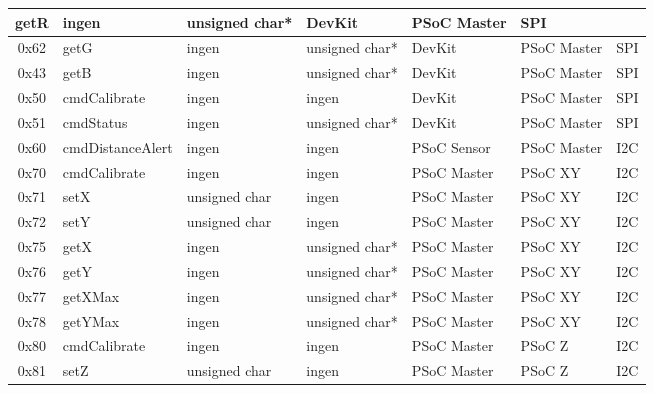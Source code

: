 \begin{table}[H]
\begin{tabular}{|c|l|l|l|l|l|l|}
        getR &
        ingen &
        unsigned char* &
        DevKit &
        PSoC Master &
        SPI \\
    \hline
        0x62 &
        getG &
        ingen &
        unsigned char* &
        DevKit &
        PSoC Master &
        SPI \\
    \hline
        0x43 &
        getB &
        ingen &
        unsigned char* &
        DevKit &
        PSoC Master &
        SPI \\
    \hline
        0x50 &
        cmdCalibrate &
        ingen &
        ingen &
        DevKit &
        PSoC Master &
        SPI \\
    \hline
        0x51 &
        cmdStatus &
        ingen &
        unsigned char* &
        DevKit &
        PSoC Master &
        SPI \\
    \hline
        0x60 &
        cmdDistanceAlert &
        ingen &
        ingen &
        PSoC Sensor &
        PSoC Master &
        I2C \\
    \hline
        0x70 &
        cmdCalibrate &
        ingen &
        ingen &
        PSoC Master &
        PSoC XY &
        I2C \\
    \hline
        0x71 &
        setX &
        unsigned char &
        ingen &
        PSoC Master &
        PSoC XY &
        I2C \\
    \hline
        0x72 &
        setY &
        unsigned char &
        ingen &
        PSoC Master &
        PSoC XY &
        I2C \\
    \hline
        0x75 &
        getX &
        ingen &
        unsigned char* &
        PSoC Master &
        PSoC XY &
        I2C \\
    \hline
        0x76 &
        getY &
        ingen &
        unsigned char* &
        PSoC Master &
        PSoC XY &
        I2C \\
    \hline
        0x77 &
        getXMax &
        ingen &
        unsigned char* &
        PSoC Master &
        PSoC XY &
        I2C \\
    \hline
        0x78 &
        getYMax &
        ingen &
        unsigned char* &
        PSoC Master &
        PSoC XY &
        I2C \\
    \hline
        0x80 &
        cmdCalibrate &
        ingen &
        ingen &
        PSoC Master &
        PSoC Z &
        I2C \\
    \hline
        0x81 &
        setZ &
        unsigned char &
        ingen &
        PSoC Master &
        PSoC Z &
        I2C \\

\end{tabular}
\end{table}
